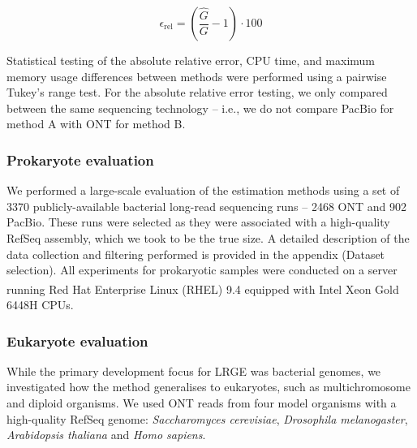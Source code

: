 \documentclass[unnumsec,webpdf,modern,large]{oup-authoring-template}
\theoremstyle{thmstyleone}%
\theoremstyle{thmstyletwo}%
\theoremstyle{thmstylethree}%
\newcommand{\lrge}{LRGE}
\begin{document}
\begin{equation}\label{eq:rel_err}
    \epsilon_{\text{rel}} = \left( \frac{\hat{G}}{G} - 1 \right) \cdot 100
\end{equation}

Statistical testing of the absolute relative error, CPU time, and maximum memory usage differences between methods were performed using a pairwise Tukey's range test. For the absolute relative error testing, we only compared between the same sequencing technology -- i.e., we do not compare PacBio for method A with ONT for method B.


\subsubsection{Prokaryote evaluation}
\label{sec:prok}

We performed a large-scale evaluation of the estimation methods using a set of 3370 publicly-available bacterial long-read sequencing runs -- 2468 ONT and 902 PacBio. These runs were selected as they were associated with a high-quality RefSeq assembly, which we took to be the true size. A detailed description of the data collection and filtering performed is provided in the appendix (Dataset selection).
All experiments for prokaryotic samples were conducted on a server running Red Hat Enterprise Linux (RHEL) 9.4 equipped with Intel\textsuperscript{\tiny{\textregistered}} Xeon\textsuperscript{\tiny{\textregistered}} Gold 6448H CPUs. 

\subsubsection{Eukaryote evaluation}
\label{sec:methods_euk}

While the primary development focus for \lrge{} was bacterial genomes, we investigated how the method generalises to eukaryotes, such as multichromosome and diploid organisms. We used ONT reads from four model organisms with a high-quality RefSeq genome: \textit{Saccharomyces cerevisiae}, \textit{Drosophila melanogaster}, \textit{Arabidopsis thaliana} and \textit{Homo sapiens}.
\end{document}
